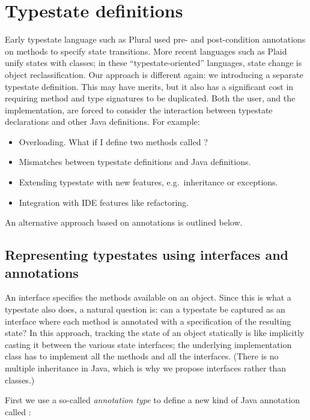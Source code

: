 \section{Typestate definitions}

Early typestate language such as Plural \cite{bierhoff11} used pre-
and post-condition annotations on methods to specify state
transitions. More recent languages such as Plaid \cite{garcia14} unify
states with classes; in these ``typestate-oriented'' languages, state
change is object reclassification. Our approach is different again: we
introducing a separate typestate definition. This may have merits, but
it also has a significant cost in requiring method and type signatures
to be duplicated. Both the user, and the implementation, are forced to
consider the interaction between typestate declarations and other Java
definitions. For example:

\begin{itemize}
\item Overloading. What if I define two methods called ?
\item Mismatches between typestate definitions and Java definitions.
\item Extending typestate with new features, e.g.~inheritance or
  exceptions.
\item Integration with IDE features like refactoring.
\end{itemize}

\noindent An alternative approach based on annotations is outlined
below.

\subsection{Representing typestates using interfaces and annotations}

An interface specifies the methods available on an object. Since this
is what a typestate also does, a natural question is: can a typestate
be captured as an interface where each method is annotated with a
specification of the resulting state? In this approach, tracking the
state of an object statically is like implicitly casting it between
the various state interfaces; the underlying implementation class has
to implement all the methods and all the interfaces. (There is no
multiple inheritance in Java, which is why we propose interfaces
rather than classes.)

First we use a so-called \emph{annotation type} to define a new kind
of Java annotation called :

